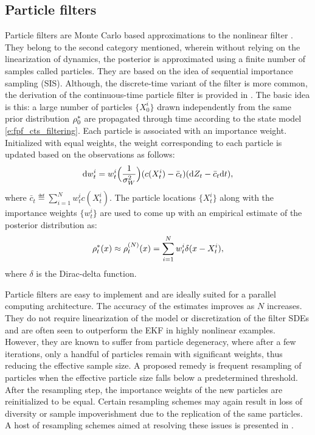 \subsection{Particle filters}
\label{e:fpf_particle}
Particle filters are Monte Carlo based approximations to the nonlinear filter \cite{doucet2000sequential}.  They belong to the second category mentioned, wherein without relying on the linearization of dynamics, the posterior is approximated using a finite number of samples called particles. They are based on the idea of sequential importance sampling (SIS). Although, the discrete-time variant of the filter is more common, the derivation of the continuous-time particle filter is provided in \cite{kutsurpfi19}. The basic idea is this: a large number of particles $\{X^i_0\}$ drawn independently from the same prior distribution $\rho^*_0$ are propagated through time according to the state model \eqref{e:fpf_cts_filtering}. Each particle is associated with an importance weight. Initialized with equal weights, the weight corresponding to each particle is updated based on the observations as follows:
\begin{equation}
\ud w^i_t = w^i_t  \Bigl(\frac{1}{\sigma^2_W} \Bigr) (c(X^i_t)  - \bar{c}_t ) (\ud Z_t - \bar{c}_t \ud t),
\label{e:fpf_particle_wt}
\end{equation}
where $\bar{c}_t \eqdef \sum_{i=1}^N w^i_t c(X^i_t)$. The particle locations $\{X^i_t\}$ along with the importance weights $\{w^i_t\}$ are used to come up with an empirical estimate of the posterior distribution as:
\begin{equation}
\pr^*_t(x) \approx \pr^{(N)}_t(x) = \sum_{i=1}^N w^i_t \delta(x -X^i_t),
\label{e:fpf_particle_empirical}
\end{equation}
where $\delta$ is the Dirac-delta function. 

Particle filters are easy to implement and are ideally suited for a parallel computing architecture. The accuracy of the estimates improves as $N$ increases. They do not require linearization of the model or discretization of the filter SDEs and are often seen to outperform the EKF in highly nonlinear examples. However, they are known to suffer from particle degeneracy, where after a few iterations, only a handful of particles remain with significant weights, thus reducing the effective sample size. A proposed remedy is frequent resampling of particles when the effective particle size falls below a predetermined threshold. After the resampling step, the importance weights of the new particles are reinitialized to be equal. Certain resampling schemes may again result in loss of diversity or sample impoverishment due to the replication of the same particles. A host of resampling schemes aimed at resolving these issues is presented in \cite{budchelee07, arumasgorcla02}.
 
